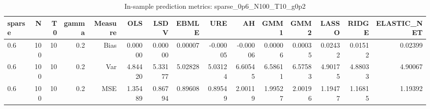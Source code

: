 \begin{table}[!htbp]\centering
\caption{In-sample prediction metrics: sparse_0p6_N100_T10_g0p2}
\label{tab:table2_sparse_0p6_N100_T10_g0p2}
\begin{tabular}{lrrrrrrrrrrrrrr}
\hline
sparse & N & T0 & gamma & Measure & OLS & LSDV & EBMLE & URE & AH & GMM1 & GMM2 & LASSO & RIDGE & ELASTIC_NET \\
\hline
0.6 & 100 & 10 & 0.2 & Bias & 0.00000 & 0.00000 & 0.00007 & -0.00005 & -0.00006 & 0.00006 & 0.00035 & 0.02432 & 0.01512 & 0.02399 \\
0.6 & 100 & 10 & 0.2 & Var & 4.84420 & 5.33177 & 5.02828 & 5.03124 & 6.60545 & 6.58611 & 6.57583 & 4.90175 & 4.88033 & 4.90067 \\
0.6 & 100 & 10 & 0.2 & MSE & 1.35489 & 0.86794 & 0.89608 & 0.89549 & 2.00119 & 1.99527 & 2.00196 & 1.19477 & 1.16815 & 1.19392 \\
\hline
\end{tabular}
\end{table}

